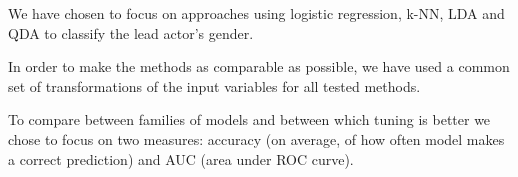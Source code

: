 \documentclass[../../project.tex]{subfiles}
\begin{document}
	We have chosen to focus on approaches using logistic regression, k-NN, LDA and QDA to classify the lead actor's gender.
	
	In order to make the methods as comparable as possible, we have used a common set of transformations of the input variables for all tested methods.
	
	To compare between families of models and between which tuning is better we chose to focus on two measures: accuracy (on average, of how often model makes a correct prediction) and AUC (area under ROC curve).
\end{document}
